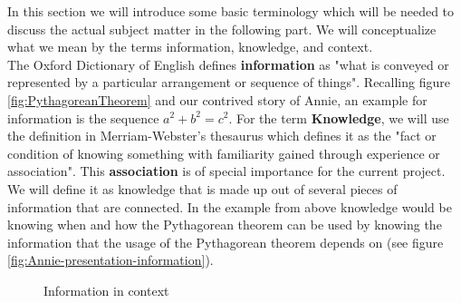 \documentclass[twoside, 12pt]{article}
\begin{document}
In this section we will introduce some basic terminology which will be needed to discuss the actual subject matter in the following part. We will conceptualize what we mean by the terms information, knowledge, and context.\\

The Oxford Dictionary of English \cite{OED:npentrel14} defines \textbf{information} as "what is conveyed or represented by a particular arrangement or sequence of things". Recalling figure \ref{fig:PythagoreanTheorem} and our contrived story of Annie, an example for information is the sequence \textit{$a^2 + b^2 = c^2$}. For the term \textbf{Knowledge}, we will use the definition in Merriam-Webster's thesaurus \cite{Webster:npentrel14} which defines it as the "fact or condition of knowing something with familiarity gained through experience or association". This \textbf{association} is of special importance for the current project. We will define it as knowledge that is made up out of several pieces of information that are connected. In the example from above knowledge would be knowing when and how the Pythagorean theorem can be used by knowing the information that the usage of the Pythagorean theorem depends on (see figure \ref{fig:Annie-presentation-information}).\\ 

\begin{figure}
\vspace{-26pt}
  \begin{center}
  \end{center}
\vspace{-20pt}
  \caption{Information in context}
  \label{fig:Annie-context}
\vspace{-10pt}
\end{figure}
\end{document}
